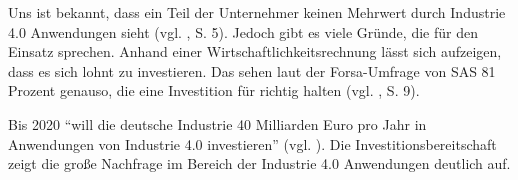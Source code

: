 Uns ist bekannt, dass ein Teil der Unternehmer keinen Mehrwert durch Industrie 4.0 Anwendungen sieht (vgl. \cite{SasForsa}, S. 5). Jedoch gibt es viele Gründe, die für den Einsatz sprechen. Anhand einer Wirtschaftlichkeitsrechnung lässt sich aufzeigen, dass es sich lohnt zu investieren. Das sehen laut der Forsa-Umfrage von SAS 81 Prozent genauso, die eine Investition für richtig halten (vgl. \cite{SasForsa}, S. 9).

Bis 2020 "`will die deutsche Industrie 40 Milliarden Euro pro Jahr in Anwendungen von Industrie 4.0 investieren"' (vgl. \cite{IndustrieHohesPotenzial}). Die Investitionsbereitschaft zeigt die große Nachfrage im Bereich der Industrie 4.0 Anwendungen deutlich auf. 







